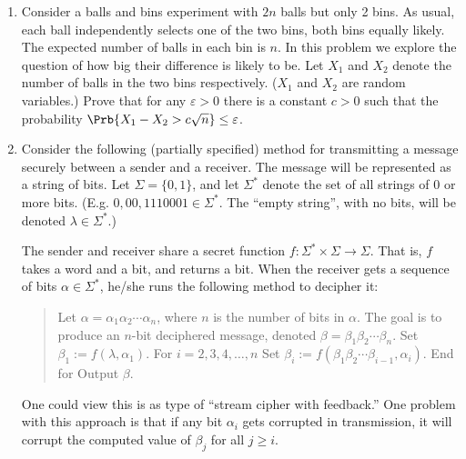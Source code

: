 \documentclass[12pt]{article}
\begin{document}
\begin{enumerate}
{}


\item
Consider a balls and bins experiment with $2n$ balls but only 2 bins.
As usual, each ball independently selects one of the two bins, both bins
equally likely. The expected
number of balls in each bin is $n$. In this problem we explore the question
of how big their difference is likely to be.
Let $X_1$ and $X_2$ denote the
number of balls in the two bins respectively. ($X_1$ and $X_2$ are random
variables.) Prove that for any $\varepsilon>0$ there is a constant
$c>0$ such that the  probability
$\Prb{X_1-X_2 > c \sqrt{n}} \le \varepsilon$.



\item

\renewcommand\^[1]{^{\langle#1\rangle}}

Consider the following (partially specified) method
for transmitting a message securely between a sender and a receiver.
The message will be represented as a string of bits.
Let $\Sigma = \{0,1\}$, and let $\Sigma^*$ denote the
set of all strings of $0$ or more bits.
(E.g. $0, 00, 1110001 \in \Sigma^*$.
The ``empty string'', with no bits, will be denoted $\lambda \in \Sigma^*.$)

The sender and receiver share a secret function
$f: \Sigma^* \times \Sigma \rightarrow \Sigma$.
That is, $f$ takes a word and a bit, and returns a bit.
When the receiver gets a sequence of bits
$\alpha \in \Sigma^*$, he/she runs the following
method to decipher it:
\begin{quote}
\begin{code}
Let $\alpha = \alpha_1 \alpha_2 \cdots \alpha_n$, where $n$ is the number of bits in $\alpha$.
The goal is to produce an $n$-bit deciphered message, denoted $\beta = \beta_1 \beta_2 \cdots \beta_n$.
Set $\beta_1 := f(\lambda, \alpha_1).$
For $i = 2, 3, 4, \ldots, n$
  Set $\beta_i := f(\beta_1 \beta_2 \cdots \beta_{i-1}, \alpha_i)$.
  End for
Output $\beta$.
\end{code}
\end{quote}
One could view this is as type of ``stream cipher with feedback.''
One problem with this approach is that if any bit $\alpha_i$
gets corrupted in transmission, it will corrupt the computed
value of $\beta_j$ for all $j \geq i$.


\end{enumerate}
\end{document}
